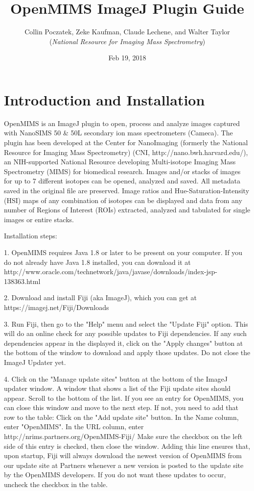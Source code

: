 \documentclass{article}
\title{\textbf{OpenMIMS ImageJ Plugin Guide}}
\date {Feb 19, 2018}
\author{Collin Poczatek, Zeke Kaufman, Claude Lechene, and Walter Taylor \\(\textit{National Resource for Imaging Mass Spectrometry})}
\begin{document}
\maketitle

\section*{Introduction and Installation }
	OpenMIMS is an ImageJ plugin to open, process and analyze images captured with
	NanoSIMS 50 \& 50L secondary ion mass spectrometers (Cameca). The plugin has been developed at the
	Center for NanoImaging (formerly the National Resource for Imaging Mass Spectrometry) (CNI, http://nano.bwh.harvard.edu/), an 
	NIH-supported National Resource developing Multi-isotope Imaging Mass Spectrometry (MIMS) for
	biomedical research. Images and/or stacks of images for up to 7 different isotopes can be opened, 
	analyzed and saved. All metadata saved in the original file are preserved. Image ratios and 
	Hue-Saturation-Intensity (HSI) maps of any combination of isotopes can be displayed and data 
	from any number of Regions of Interest (ROIs) extracted, analyzed and tabulated for single images 
	or entire stacks. 

	Installation steps:
	
	1. OpenMIMS requires Java 1.8 or later to be present on your computer.   If you do not already have Java 1.8 installed,  you can download it at http://www.oracle.com/technetwork/java/javase/downloads/index-jsp-138363.html
	
	2.  Download and install Fiji (aka ImageJ), which you can get at https://imagej.net/Fiji/Downloads
	
	3.  Run Fiji, then go to the "Help" menu and select the "Update Fiji" option.  This will do an online check for any possible updates to Fiji dependencies.  If any such dependencies appear in the displayed it, click on the "Apply changes" button at the bottom of the window to download and apply those updates.   Do not close the ImageJ Updater yet.
	
	4.  Click on the "Manage update sites" button at the bottom of the ImageJ updater window.  A window that shows a list of the Fiji update sites should appear.   Scroll to the bottom of the list.   If you see an entry for OpenMIMS, you can close this window and move to the next step.  If not, you need to add that row to the table:  Click on the "Add update site" button.   In the Name column, enter "OpenMIMS".  In the URL column, enter http://nrims.partners.org/OpenMIMS-Fiji/      Make sure the checkbox on the left side of this entry is checked,  then close the window.   Adding this line ensures that, upon startup, Fiji will always download the newest version of OpenMIMS from our update site at Partners whenever a new version is posted to the update site by the OpenMIMS developers.  If you do not want these updates to occur, uncheck the checkbox in the table.
	
\end{document}
